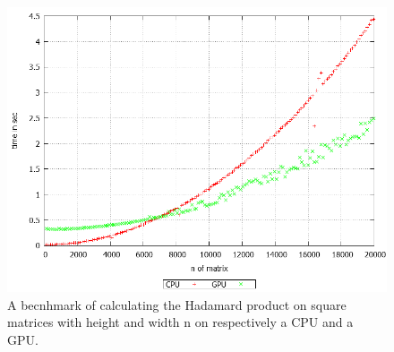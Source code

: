 \begin{figure}[h!]
\centering
 \includegraphics[width=1\textwidth]{figures/benchmark.png} %
\caption{A becnhmark of calculating the Hadamard product on square matrices with height and width n on respectively a CPU and a GPU.}\label{image:benchmark}
\vspace{-15pt}
\end{figure}
